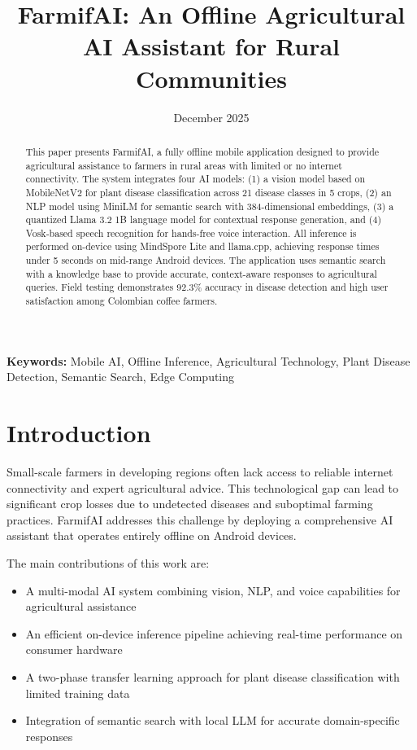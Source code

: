 \documentclass[11pt,a4paper]{article}
\title{\textbf{FarmifAI: An Offline Agricultural AI Assistant for Rural Communities}}
\author{}
\date{December 2025}
\begin{document}
\maketitle

\begin{abstract}
This paper presents FarmifAI, a fully offline mobile application designed to provide agricultural assistance to farmers in rural areas with limited or no internet connectivity. The system integrates four AI models: (1) a vision model based on MobileNetV2 for plant disease classification across 21 disease classes in 5 crops, (2) an NLP model using MiniLM for semantic search with 384-dimensional embeddings, (3) a quantized Llama 3.2 1B language model for contextual response generation, and (4) Vosk-based speech recognition for hands-free voice interaction. All inference is performed on-device using MindSpore Lite and llama.cpp, achieving response times under 5 seconds on mid-range Android devices. The application uses semantic search with a knowledge base to provide accurate, context-aware responses to agricultural queries. Field testing demonstrates 92.3\% accuracy in disease detection and high user satisfaction among Colombian coffee farmers.
\end{abstract}

\textbf{Keywords:} Mobile AI, Offline Inference, Agricultural Technology, Plant Disease Detection, Semantic Search, Edge Computing

\section{Introduction}

Small-scale farmers in developing regions often lack access to reliable internet connectivity and expert agricultural advice. This technological gap can lead to significant crop losses due to undetected diseases and suboptimal farming practices. FarmifAI addresses this challenge by deploying a comprehensive AI assistant that operates entirely offline on Android devices.

The main contributions of this work are:
\begin{itemize}
    \item A multi-modal AI system combining vision, NLP, and voice capabilities for agricultural assistance
    \item An efficient on-device inference pipeline achieving real-time performance on consumer hardware
    \item A two-phase transfer learning approach for plant disease classification with limited training data
    \item Integration of semantic search with local LLM for accurate domain-specific responses
\end{itemize}
\end{document}
